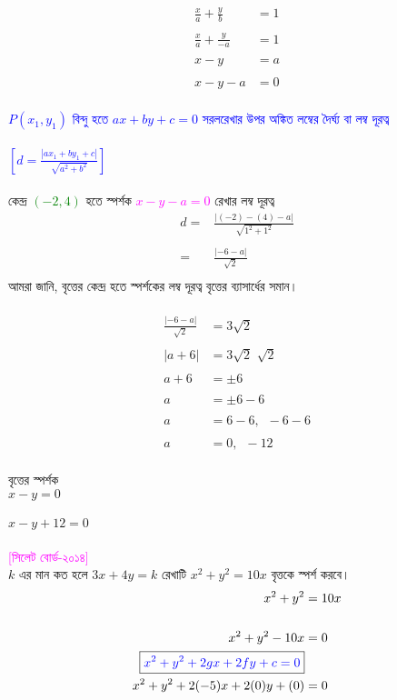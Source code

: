 \documentclass{article}
\begin{document}
\begin{align*}
	\frac{x}{a}+\frac{y}{b}&=1\\
	\\
	\frac{x}{a}+\frac{y}{-a}&=1\\
	\\
	x-y&=a\\
	\\
	x-y-a&=0
\end{align*}
\\  
\textcolor{blue}{$P(x_1,y_1)$ বিন্দু হতে  $ax+by+c=0$ সরলরেখার উপর অঙ্কিত লম্বের দৈর্ঘ্য বা লম্ব দূরত্ব \\
	\\
	$\left[d=\frac{|ax_1+by_1+c|}{\sqrt{a^2+b^2}}\right]$}\\
\\
কেন্দ্র \textcolor{green}{$(-2,4)$} হতে স্পর্শক \textcolor{magenta}{$x-y-a=0$}  রেখার লম্ব দূরত্ব \\
\begin{align*}
	d=	&\frac{|(-2)-(4)-a|}{\sqrt{1^2+1^2}}\\
	\\
	=	&	\frac{|-6-a|}{\sqrt{2}}\\
\end{align*}
আমরা জানি, বৃত্তের কেন্দ্র হতে স্পর্শকের লম্ব দূরত্ব বৃত্তের ব্যাসার্ধের সমান। \\
\\ 
\begin{align*}
	\frac{|-6-a|}{\sqrt{2}}&=3\sqrt{2}\\
	\\
	|a+6|&=3\sqrt{2}\,\,\sqrt{2}\\
	\\
	a+6&=\pm 6\\
	\\
	a&=\pm 6-6\\
	\\
	a&=6-6,\,\,\,-6-6\\
	\\
	a&=0,\,\,\,-12
\end{align*}
\\
বৃত্তের স্পর্শক \\ 
$x-y=0$\\
\\
$x-y+12=0$\\
\\
\textcolor{magenta}{[সিলেট বোর্ড-২০১৪]}\\
$k$ এর মান কত হলে  $3x+4y=k$ রেখাটি $x^2+y^2=10x$ বৃত্তকে স্পর্শ করবে। \\
	\begin{align*}
x^2+y^2&=10x\\
\\
x^2+y^2-10x&=0\\
	\boxed{\textcolor{blue}{x^2+y^2+2gx+2fy+c=0}}&\\
	x^2+y^2+2(-5)x+2(0)y+(0)&=0
\end{align*}
\end{document}
